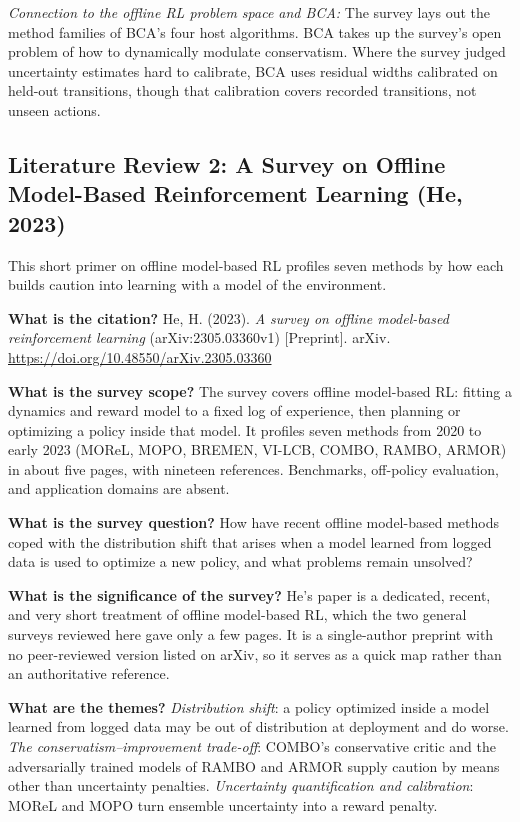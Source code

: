 \documentclass[11pt]{article}
\newcommand{\paper}[1]{\subsection*{#1}}
\newcommand{\q}[2]{\item \textbf{#1} #2}
\newcommand{\tiein}[1]{\par\smallskip\noindent\emph{Connection to the offline RL problem space and BCA:} #1\par\medskip}
\begin{document}
\tiein{The survey lays out the method families of BCA's four host algorithms. BCA takes up the survey's open problem of how to dynamically modulate conservatism. Where the survey judged uncertainty estimates hard to calibrate, BCA uses residual widths calibrated on held-out transitions, though that calibration covers recorded transitions, not unseen actions.}

\paper{Literature Review 2: A Survey on Offline Model-Based Reinforcement Learning (He, 2023)}
This short primer on offline model-based RL profiles seven methods by how each builds caution into learning with a model of the environment.
\begin{qna}

\q{What is the citation?}
He, H. (2023). \emph{A survey on offline model-based reinforcement learning} (arXiv:2305.03360v1) [Preprint]. arXiv. \url{https://doi.org/10.48550/arXiv.2305.03360}

\q{What is the survey scope?}
The survey covers offline model-based RL: fitting a dynamics and reward model to a fixed log of experience, then planning or optimizing a policy inside that model. It profiles seven methods from 2020 to early 2023 (MOReL, MOPO, BREMEN, VI-LCB, COMBO, RAMBO, ARMOR) in about five pages, with nineteen references. Benchmarks, off-policy evaluation, and application domains are absent.

\q{What is the survey question?}
How have recent offline model-based methods coped with the distribution shift that arises when a model learned from logged data is used to optimize a new policy, and what problems remain unsolved?

\q{What is the significance of the survey?}
He's paper is a dedicated, recent, and very short treatment of offline model-based RL, which the two general surveys reviewed here gave only a few pages. It is a single-author preprint with no peer-reviewed version listed on arXiv, so it serves as a quick map rather than an authoritative reference.

\q{What are the themes?}
\emph{Distribution shift}: a policy optimized inside a model learned from logged data may be out of distribution at deployment and do worse. \emph{The conservatism--improvement trade-off}: COMBO's conservative critic and the adversarially trained models of RAMBO and ARMOR supply caution by means other than uncertainty penalties. \emph{Uncertainty quantification and calibration}: MOReL and MOPO turn ensemble uncertainty into a reward penalty.


\end{qna}
\end{document}
